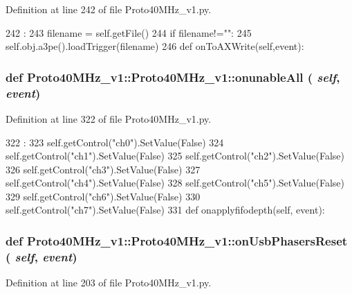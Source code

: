 Definition at line 242 of file Proto40MHz\_\-v1.py.


\begin{DoxyCode}
242                                   :
243         filename = self.getFile()
244         if filename!="":
245             self.obj.a3pe().loadTrigger(filename)
246 
    def onToAXWrite(self,event):
\end{DoxyCode}
\hypertarget{classProto40MHz__v1_1_1Proto40MHz__v1_aaed3ee68a9a54d855a03d0c98ee11b3c}{
\subsubsection[{onunableAll}]{\setlength{\rightskip}{0pt plus 5cm}def Proto40MHz\_\-v1::Proto40MHz\_\-v1::onunableAll ( {\em self}, \/   {\em event})}}
\label{classProto40MHz__v1_1_1Proto40MHz__v1_aaed3ee68a9a54d855a03d0c98ee11b3c}


Definition at line 322 of file Proto40MHz\_\-v1.py.


\begin{DoxyCode}
322                                 :
323         self.getControl("ch0").SetValue(False)
324         self.getControl("ch1").SetValue(False)
325         self.getControl("ch2").SetValue(False)
326         self.getControl("ch3").SetValue(False)
327         self.getControl("ch4").SetValue(False)
328         self.getControl("ch5").SetValue(False)
329         self.getControl("ch6").SetValue(False)
330         self.getControl("ch7").SetValue(False)
331 
    def onapplyfifodepth(self, event):
\end{DoxyCode}
\hypertarget{classProto40MHz__v1_1_1Proto40MHz__v1_a007403f533cdce042c3e0a0ec776677f}{
\subsubsection[{onUsbPhasersReset}]{\setlength{\rightskip}{0pt plus 5cm}def Proto40MHz\_\-v1::Proto40MHz\_\-v1::onUsbPhasersReset ( {\em self}, \/   {\em event})}}
\label{classProto40MHz__v1_1_1Proto40MHz__v1_a007403f533cdce042c3e0a0ec776677f}


Definition at line 203 of file Proto40MHz\_\-v1.py.


